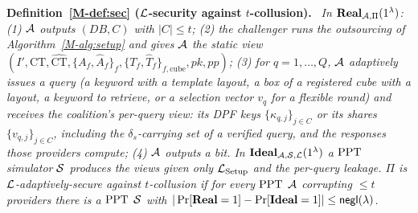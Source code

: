 \documentclass[11pt,a4paper]{article}
\newcommand{\mref}[1]{\ref{M-#1}}
\newenvironment{restated}[1]{\par\medskip\noindent\textbf{#1.}\ \itshape}{\par\medskip}
\begin{document}
\begin{restated}{Definition~\mref{def:sec} ($\mathcal{L}$-security against $t$-collusion)}
In $\mathbf{Real}_{\mathcal{A},\Pi}(1^\lambda)$: (1) $\mathcal{A}$ outputs $(DB,C)$ with $|C|\le t$;
(2) the challenger runs the outsourcing of Algorithm~\mref{alg:setup} and gives $\mathcal{A}$ the static view
$(I',\text{CT},\widehat{\text{CT}},\{A_f,\widehat A_f\}_f,\{T_f,\widehat
T_f\}_{f,\text{cube}},pk,pp)$;
(3) for $q=1,\dots,Q$, $\mathcal{A}$ adaptively issues a query (a keyword with a
template layout, a box of a registered cube with a layout, a keyword to
retrieve, or a selection vector $v_q$ for a flexible round) and receives the coalition's per-query view: its DPF keys
$\{\kappa_{q,j}\}_{j\in C}$ or its shares $\{v_{q,j}\}_{j\in C}$, including the
$\delta_s$-carrying set of a verified query, and the responses those providers
compute; (4) $\mathcal{A}$
outputs a bit. In $\mathbf{Ideal}_{\mathcal{A},\mathcal{S},\mathcal{L}}(1^\lambda)$ a $\mathrm{PPT}$ simulator
$\mathcal{S}$ produces the views given only $\mathcal{L}_{\mathrm{Setup}}$ and the
per-query leakage. $\Pi$ is $\mathcal{L}$-adaptively-secure against $t$-collusion if
for every $\mathrm{PPT}$ $\mathcal{A}$ corrupting $\le t$ providers there is a $\mathrm{PPT}$ $\mathcal{S}$
with $|\Pr[\mathbf{Real}=1]-\Pr[\mathbf{Ideal}=1]|\le\mathsf{negl}(\lambda)$.
\end{restated}
\end{document}
